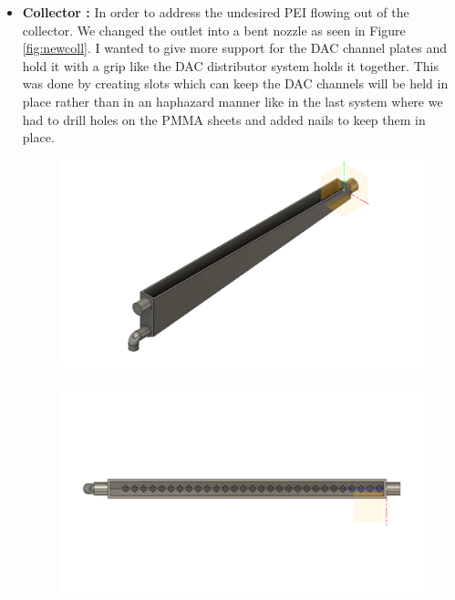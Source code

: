 \begin{itemize}
    \item \textbf{Collector :} In order to address the undesired PEI flowing out of the collector. We changed the outlet into a bent nozzle as seen in Figure \ref{fig:newcoll}. I wanted to give more support for the DAC channel plates and hold it with a grip like the DAC distributor system holds it together. This was done by creating slots which can keep the DAC channels will be held in place rather than in an haphazard manner like in the last system where we had to drill holes on the PMMA sheets and added nails to keep them in place. 
    
    \begin{figure}[H]
        \centering
        \begin{minipage}{.5\textwidth}
        \centering
        \includegraphics[width=\linewidth]{images/mywork/Sprint4/Collector_main.png}
         \label{fig:newcoll}
    \end{minipage}%
    \begin{minipage}{.5\textwidth}
        \centering
        \includegraphics[width=\linewidth]{images/mywork/Sprint4/Collector_new_top.png}
        \label{fig:newcolltop}
    \end{minipage}
    \end{figure}
    

\end{itemize}
